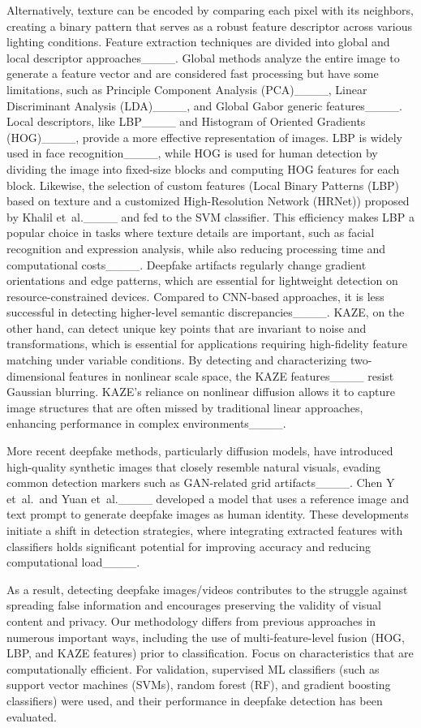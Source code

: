 Alternatively, texture can be encoded by comparing each pixel with its neighbors, creating a binary pattern that serves as a robust feature descriptor across various lighting conditions. Feature extraction techniques are divided into global and local descriptor approaches____. Global methods analyze the entire image to generate a feature vector and are considered fast processing but have some limitations, such as Principle Component Analysis (PCA)____, Linear Discriminant Analysis (LDA)____, and Global Gabor generic features____. Local descriptors, like LBP____ and Histogram of Oriented Gradients (HOG)____, provide a more effective representation of images. LBP is widely used in face recognition____, while HOG is used for human detection by dividing the image into fixed-size blocks and computing HOG features for each block. Likewise, the selection of custom features (Local Binary Patterns (LBP) based on texture and a customized High-Resolution Network (HRNet)) proposed by Khalil et~al.____ and fed to the SVM classifier. %
This efficiency makes LBP a popular choice in tasks where texture details are important, such as facial recognition and expression analysis, while also reducing processing time and computational costs____. Deepfake artifacts regularly change gradient orientations and edge patterns, which are essential for lightweight detection on resource-constrained devices. Compared to CNN-based approaches, it is less successful in detecting higher-level semantic discrepancies____. KAZE, on the other hand, can detect unique key points that are invariant to noise and transformations, which is essential for applications requiring high-fidelity feature matching under variable conditions. By detecting and characterizing two-dimensional features in nonlinear scale space, the KAZE features____ resist Gaussian blurring. KAZE’s reliance on nonlinear diffusion allows it to capture image structures that are often missed by traditional linear approaches, enhancing performance in complex environments____.

More recent deepfake methods, particularly diffusion models, have introduced high-quality synthetic images that closely resemble natural visuals, evading common detection markers such as GAN-related grid artifacts____. Chen Y et~al.~and Yuan et~al.____ developed a model that uses a reference image and text prompt to generate deepfake images as human identity. These developments initiate a shift in detection strategies, where integrating extracted features with classifiers holds significant potential for improving accuracy and reducing computational load____. 

As a result, detecting deepfake images/videos contributes to the struggle against spreading false information and encourages preserving the validity of visual content and privacy. Our methodology differs from previous approaches in numerous important ways, including the use of multi-feature-level fusion (HOG, LBP, and KAZE features) prior to classification. Focus on characteristics that are computationally efficient. For validation, supervised ML classifiers (such as support vector machines (SVMs), random forest (RF), and gradient boosting classifiers) were used, and their performance in deepfake detection has been evaluated.